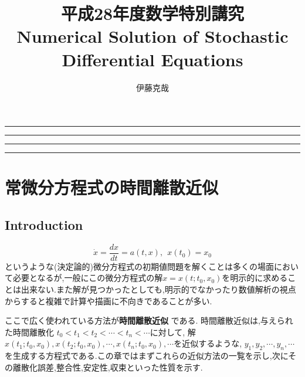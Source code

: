 \documentclass[a4paper,dvipdfmx]{jreport}
\title{平成28年度数学特別講究\\Numerical Solution of Stochastic Differential Equations}
\author{伊藤克哉}
\makeatletter
\numberwithin{equation}{section}
\def\eq{\begin{equation}}
\def\eqx{\end{equation}}
\renewcommand{\maketitle}{\begin{titlepage}%
    \let\footnotesize\small
    \let\footnoterule\relax
    \parindent \z@
    \reset@font
    \null
    \vskip 50\p@
    \begin{center}
      \hrule height 1pt
      \vskip 2pt 
      \hrule
      \vskip 3pt
      {\huge \bfseries \strut \@title \strut}\par
      \vskip 2pt
      \hrule
      \vskip 2pt
      \hrule height 1pt
    \end{center}
    \vskip 50\p@
    \begin{flushright}
      \Large \@author \par
    \end{flushright}
    \vfil
    \null
    \begin{flushright}
        {\small \@date}%
    \end{flushright}
  \end{titlepage}%
  \setcounter{footnote}{0}%
}
\makeatother
\begin{document}
\maketitle
\tableofcontents


\chapter{常微分方程式の時間離散近似}
\section{Introduction}
\eq
\label{eq1}
\dot{x} = \frac{dx}{dt} = a(t,x), \  \  x(t_0) = x_0
\eqx
というような(決定論的)微分方程式の初期値問題を解くことは多くの場面において必要となるが,一般にこの微分方程式の解$x = x(t;t_0,x_0)$を明示的に求めることは出来ない.また解が見つかったとしても,明示的でなかったり数値解析の視点からすると複雑で計算や描画に不向きであることが多い.\par
ここで広く使われている方法が{\bf 時間離散近似} である.
時間離散近似は,与えられた時間離散化 $ t_0 < t_1 < t_2 < \cdots < t_n < \cdots $に対して,
解$x(t_1;t_0,x_0),x(t_2;t_0,x_0),\cdots,x(t_n;t_0,x_0),\cdots$を近似するような,
$y_1,y_2,\cdots,y_n,\cdots$を生成する方程式である.この章ではまずこれらの近似方法の一覧を示し,次にその離散化誤差,整合性,安定性,収束といった性質を示す.
\end{document}
